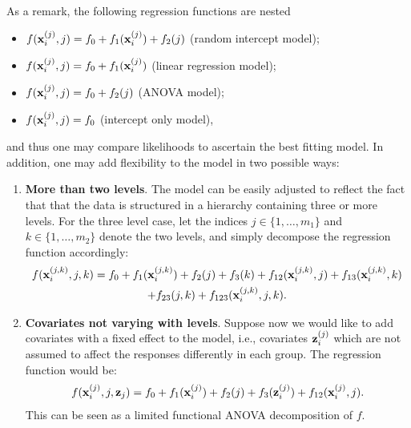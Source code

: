 As a remark, the following regression functions are nested 
\begin{itemize}
  \item $f({\mathbf x}_i^{(j)}, j) = f_0 + f_1({\mathbf x}_i^{(j)}) + f_2(j)$ (random intercept model);  %
  \item $f({\mathbf x}_i^{(j)}, j) = f_0 + f_1({\mathbf x}_i^{(j)})$ (linear regression model);
  \item $f({\mathbf x}_i^{(j)}, j) = f_0 + f_2(j)$ (ANOVA model);
  \item $f({\mathbf x}_i^{(j)}, j) = f_0 $ (intercept only model),
\end{itemize}
and thus one may compare likelihoods to ascertain the best fitting model.
In addition, one may add flexibility to the model in two possible ways:
\begin{enumerate}
  \item \textbf{More than two levels}. The model can be easily adjusted to reflect the fact that that the data is structured in a hierarchy containing three or more levels. For the three level case, let the indices $j\in\{1,\dots,m_1\}$ and $k\in\{1,\dots,m_2\}$ denote the two levels, and simply decompose the regression function accordingly:
  \begin{align*}
    \begin{gathered}
      f({\mathbf x}_i^{(j,k)}, j, k) = f_0 + f_1({\mathbf x}_i^{(j,k)}) + f_2(j) + f_3(k) + f_{12}({\mathbf x}_i^{(j,k)}, j) + f_{13}({\mathbf x}_i^{(j,k)}, k)\\ 
      + f_{23}(j, k) + f_{123}({\mathbf x}_i^{(j,k)}, j, k).
    \end{gathered}
  \end{align*}
  \item \textbf{Covariates not varying with levels}. Suppose now we would like to add covariates with a fixed effect to the model, i.e., covariates ${\mathbf z}_i^{(j)}$ which are not assumed to affect the responses differently in each group. The regression function would be:
  \begin{align*}
    \begin{gathered}
      f({\mathbf x}_i^{(j)}, j, {\mathbf z}_j) = f_0 + f_1({\mathbf x}_i^{(j)}) + f_2(j) + f_3({\mathbf z}_i^{(j)}) + f_{12}({\mathbf x}_i^{(j)}, j).
    \end{gathered}
  \end{align*}
  This can be seen as a limited functional ANOVA decomposition of $f$.
\end{enumerate}

